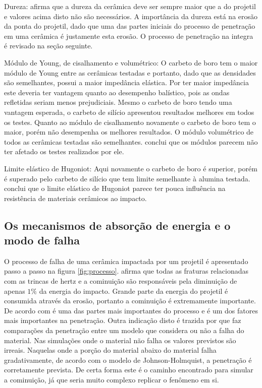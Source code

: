 Dureza: \cite{reijel} afirma que a dureza da cerâmica deve ser sempre maior que a do projetil e valores acima disto não são necessários. A importância da dureza está na erosão da ponta do projetil, dado que uma das partes iniciais do processo de penetração em uma cerâmica é justamente esta erosão. O processo de penetração na integra é revisado na seção seguinte.

Módulo de Young, de cisalhamento e volumétrico: O carbeto de boro tem o maior módulo de Young entre as cerâmicas testadas e portanto, dado que as densidades são semelhantes, possui a maior impedância elástica. Por ter maior impedância este deveria ter vantagem quanto ao desempenho balístico, pois as ondas refletidas seriam menos prejudiciais. Mesmo o carbeto de boro tendo uma vantagem esperada, o carbeto de silício apresentou resultados melhores em todos os testes. Quanto ao módulo de cisalhamento novamente o carbeto de boro tem o maior, porém  não desempenha os melhores resultados. O módulo volumétrico de todos as cerâmicas testadas são semelhantes. \cite{kaufmann_cronin_worswick_pageau_beth_2003} conclui que os módulos parecem não ter afetado os testes realizados por ele.

Limite elástico de Hugoniot: Aqui novamente o carbeto de boro é superior, porém é superado pelo carbeto de silício que tem  limite semelhante à alumina testada. \cite{kaufmann_cronin_worswick_pageau_beth_2003} conclui que o limite elástico de Hugoniot parece ter pouca influência na resistência de materiais cerâmicos ao impacto.

\subsection{Os mecanismos de absorção de energia e o modo de falha}

O processo de falha de uma cerâmica impactada por um projetil é apresentado passo a passo na figura \ref{fig:processo}.
\cite{Crouch} afirma que todas as fraturas relacionadas com as trincas de hertz e a cominuição são responsáveis pela diminuição de apenas $1\%$ da energia do impacto. Grande parte da energia do projetil é consumida através da erosão, portanto a cominuição é extremamente importante. De acordo com \cite{anderson} é uma das partes mais importantes do processo e é um dos fatores mais importantes na penetração. Outra indicação disto é trazida por \cite{holmquist_johnson_2002} que faz comparações da penetração entre um modelo que considera ou não a falha do material. Nas simulações onde o material não falha os valores previstos são irreais. Naquelas onde a porção do material abaixo do material falha gradativamente, de acordo com o modelo de Johnson-Holmquist, a penetração é corretamente prevista. De certa forma este é o caminho encontrado para simular a cominuição, já que seria muito complexo replicar o fenômeno em si. \\

